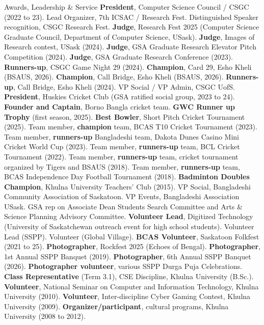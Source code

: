 \begin{rubric}{Awards, Leadership \& Service}
	\textbf{President}, Computer Science Council / CSGC (2022 to 23). Lead Organizer, 7th ICSAC / Research Fest. Distinguished Speaker recognition, CSGC Research Fest. \textbf{Judge}, Research Fest 2025 (Computer Science Graduate Council, Department of Computer Science, USask). \textbf{Judge}, Images of Research contest, USask (2024). \textbf{Judge}, GSA Graduate Research Elevator Pitch Competition (2024). \textbf{Judge}, GSA Graduate Research Conference (2023). \textbf{Runners-up}, CSGC Game Night 29 (2024). \textbf{Champion}, Card 29, Esho Kheli (BSAUS, 2026). \textbf{Champion}, Call Bridge, Esho Kheli (BSAUS, 2026). \textbf{Runners-up}, Call Bridge, Esho Kheli (2024). VP Social / VP Admin, CSGC UofS. \textbf{President}, Huskies Cricket Club (GSA ratified social group, 2023 to 24). \textbf{Founder and Captain}, Borno Bangla cricket team. \textbf{GWC Runner up Trophy} (first season, 2025). \textbf{Best Bowler}, Short Pitch Cricket Tournament (2025). Team member, \textbf{champion} team, BCAS T10 Cricket Tournament (2023). Team member, \textbf{runners-up} Bangladeshi team, Dakota Dunes Casino Mini Cricket World Cup (2023). Team member, \textbf{runners-up} team, BCL Cricket Tournament (2022). Team member, \textbf{runners-up} team, cricket tournament organized by Tigers and BSAUS (2018). Team member, \textbf{runners-up} team, BCAS Independence Day Football Tournament (2018). \textbf{Badminton Doubles Champion}, Khulna University Teachers' Club (2015). VP Social, Bangladeshi Community Association of Saskatoon. VP Events, Bangladeshi Association USask. GSA rep on Associate Dean Students Search Committee and Arts \& Science Planning Advisory Committee. \textbf{Volunteer Lead}, Digitized Technology (University of Saskatchewan outreach event for high school students). Volunteer Lead (SSPP). Volunteer (Global Village). \textbf{BCAS Volunteer}, Saskatoon Folkfest (2021 to 25). \textbf{Photographer}, Rockfest 2025 (Echoes of Bengal). \textbf{Photographer}, 1st Annual SSPP Banquet (2019). \textbf{Photographer}, 6th Annual SSPP Banquet (2026). \textbf{Photographer volunteer}, various SSPP Durga Puja Celebrations. \textbf{Class Representative} (Term 3.1), CSE Discipline, Khulna University (B.Sc.). \textbf{Volunteer}, National Seminar on Computer and Information Technology, Khulna University (2010). \textbf{Volunteer}, Inter-discipline Cyber Gaming Contest, Khulna University (2009). \textbf{Organizer/participant}, cultural programs, Khulna University (2008 to 2012).
\end{rubric}

